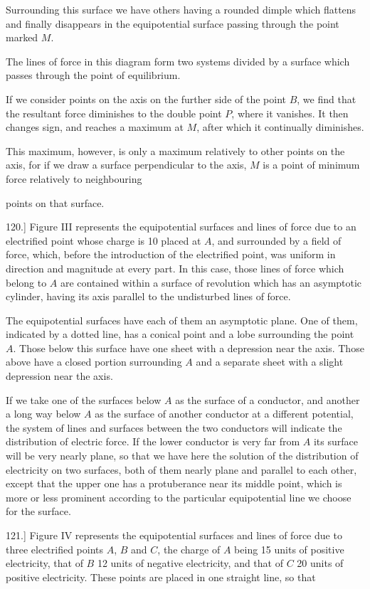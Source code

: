 \documentclass[11pt,a4paper]{article}
\begin{document}
Surrounding this surface we have others having a rounded dimple which flattens and finally disappears in the equipotential surface passing through the point marked $M$.

The lines of force in this diagram form two systems divided by a surface which passes through the point of equilibrium.

If we consider points on the axis on the further side of the point $B$, we find that the resultant force diminishes to the double point $P$, where it vanishes. It then changes sign, and reaches a maximum at $M$, after which it continually diminishes.

This maximum, however, is only a maximum relatively to other points on the axis, for if we draw a surface perpendicular to the axis, $M$ is a point of minimum force relatively to neighbouring

points on that surface.

120.] Figure III represents the equipotential surfaces and lines of force due to an electrified point whose charge is 10 placed at $A$, and surrounded by a field of force, which, before the introduction of the electrified point, was uniform in direction and magnitude at every part. In this case, those lines of force which belong to $A$ are contained within a surface of revolution which has an asymptotic cylinder, having its axis parallel to the undisturbed lines of force.

The equipotential surfaces have each of them an asymptotic plane. One of them, indicated by a dotted line, has a conical point and a lobe surrounding the point $A$. Those below this surface have one sheet with a depression near the axis. Those above have a closed portion surrounding $A$ and a separate sheet with a slight depression near the axis.

If we take one of the surfaces below $A$ as the surface of a conductor, and another a long way below $A$ as the surface of another conductor at a different potential, the system of lines and surfaces between the two conductors will indicate the distribution of electric force. If the lower conductor is very far from $A$ its surface will be very nearly plane, so that we have here the solution of the distribution of electricity on two surfaces, both of them nearly plane and parallel to each other, except that the upper one has a protuberance near its middle point, which is more or less prominent according to the particular equipotential line we choose for the surface.

121.] Figure IV represents the equipotential surfaces and lines of force due to three electrified points $A$, $B$ and $C$, the charge of $A$ being 15 units of positive electricity, that of $B$ 12 units of negative electricity, and that of $C$ 20 units of positive electricity. These points are placed in one straight line, so that
\end{document}
